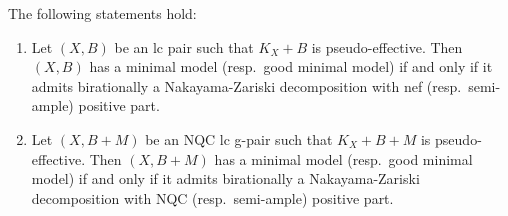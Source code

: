 	\begin{thm} \label{thm:MM_NQC_NZD}
		The following statements hold:
		
		\begin{enumerate}[\normalfont (i)]
			\item Let $ (X,B) $ be an lc pair such that $ K_X+B $ is pseudo-effective. Then $ (X,B) $ has a minimal model (resp.\ good minimal model) if and only if it admits birationally a Nakayama-Zariski decomposition with nef (resp.\ semi-ample) positive part.
			
			\item Let $ (X,B+M) $ be an NQC lc g-pair such that $ K_X+B+M $ is pseudo-effective. Then $ (X,B+M) $ has a minimal model (resp.\ good minimal model) if and only if it admits birationally a Nakayama-Zariski decomposition with NQC (resp.\ semi-ample) positive part.
		\end{enumerate}
	\end{thm}
	
